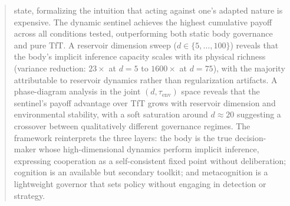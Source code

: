 \documentclass[11pt,a4paper]{article}
\theoremstyle{definition}
\begin{document}
\begin{abstract}
state, formalizing the intuition that acting against one's adapted nature is expensive.
The dynamic sentinel achieves the highest cumulative payoff across all conditions tested,
outperforming both static body governance and pure TfT.
A reservoir dimension sweep ($d \in \{5, \ldots, 100\}$) reveals that the body's
implicit inference capacity scales with its physical richness (variance reduction:
$23\times$ at $d = 5$ to $1600\times$ at $d = 75$), with the majority attributable to
reservoir dynamics rather than regularization artifacts.
A phase-diagram analysis in the joint $(d, \tau_{\mathrm{env}})$ space reveals
that the sentinel's payoff advantage over TfT grows with reservoir dimension and
environmental stability, with a soft saturation around $d \approx 20$ suggesting
a crossover between qualitatively different governance regimes.
The framework reinterprets the three layers: the body is the true decision-maker whose
high-dimensional dynamics perform implicit inference, expressing cooperation as a
self-consistent fixed point without deliberation; cognition is an available but secondary
toolkit; and metacognition is a lightweight governor that sets policy without engaging
in detection or strategy.
\end{abstract}

\tableofcontents
\newpage
\end{document}
